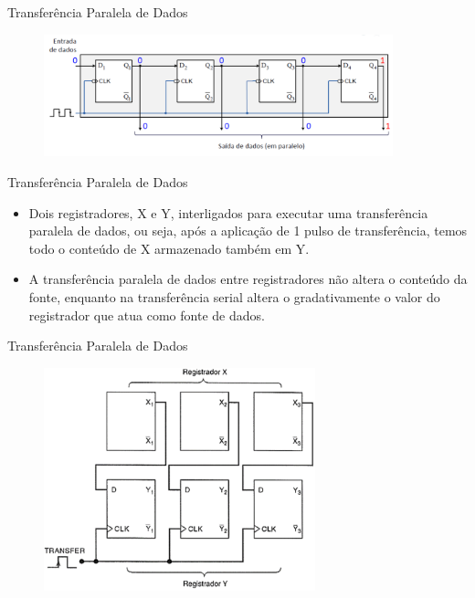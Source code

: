 \documentclass{beamer}
\begin{document}
\begin{frame}{Transferência Paralela de Dados
 }

\begin{figure}
\centering
\includegraphics[width=0.9\textwidth]{figures/par_5.png}
\end{figure}


\end{frame}


\begin{frame}{Transferência Paralela de Dados
 }

\begin{itemize}
 \item Dois registradores, X e Y, interligados para executar uma transferência paralela de dados, ou seja, após a aplicação de 1 pulso de transferência, temos todo o conteúdo de X armazenado também em Y. 

\item A transferência paralela de dados entre registradores não altera o conteúdo da fonte, enquanto na transferência serial altera o gradativamente o valor do registrador que atua como fonte de dados. 

\end{itemize}


\end{frame}

\begin{frame}{Transferência Paralela de Dados
 }

\begin{figure}
\centering
\includegraphics[width=0.7\textwidth]{figures/paralelo.png}
\end{figure}


\end{frame}
\end{document}
